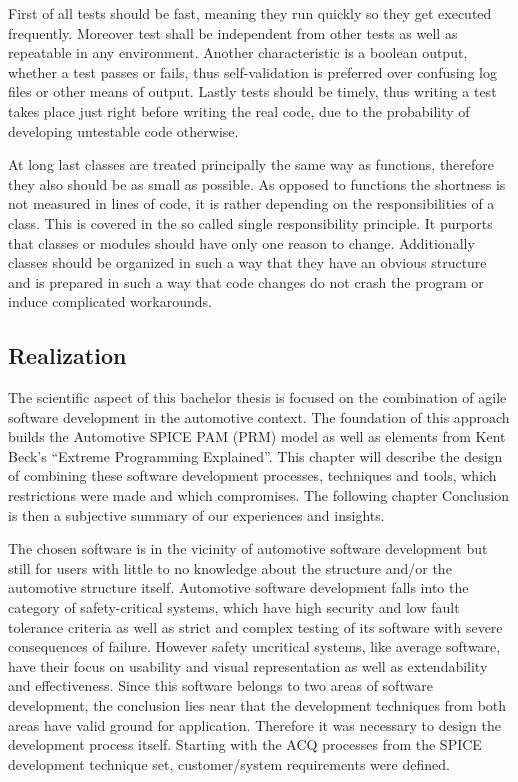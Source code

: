 First of all tests should be fast, meaning they run quickly so they get executed frequently. Moreover test shall be independent from other tests 
as well as repeatable in any environment. Another characteristic is a boolean output, whether a test passes or fails, thus self-validation is 
preferred over confusing log files or other means of output. Lastly tests should be timely, thus writing a test takes place just right before 
writing the real code, due to the probability of developing untestable code otherwise.

At long last classes are treated principally the same way as functions, therefore they also should be as small as possible. As opposed to 
functions the shortness is not measured in lines of code, it is rather depending on the responsibilities of a class. This is covered in the so 
called single responsibility principle. It purports that classes or modules should have only one reason to change. Additionally classes should 
be organized in such a way that they have an obvious structure and is prepared in such a way that code changes do not crash the program or 
induce complicated workarounds.


\subsection{Realization}

The scientific aspect of this bachelor thesis is focused on the combination of agile software development in the automotive context. The 
foundation of this approach builds the Automotive SPICE PAM (PRM) model as well as elements from Kent Beck’s “Extreme Programming Explained”. 
This chapter will describe the design of combining these software development processes, techniques and tools, which restrictions were made 
and which compromises. The following chapter Conclusion is then a subjective summary of our experiences and insights.

The chosen software is in the vicinity of automotive software development but still for users with little to no knowledge about the structure 
and/or the automotive structure itself. Automotive software development falls into the category of safety-critical systems, which have high 
security and low fault tolerance criteria as well as strict and complex testing of its software with severe consequences of failure. However 
safety uncritical systems, like average software, have their focus on usability and visual representation as well as extendability and 
effectiveness. Since this software belongs to two areas of software development,  the conclusion lies near that the development techniques 
from both areas have valid ground for application. Therefore it was necessary to design the development process itself. Starting with the ACQ 
processes from the SPICE development technique set, customer/system requirements were defined.


